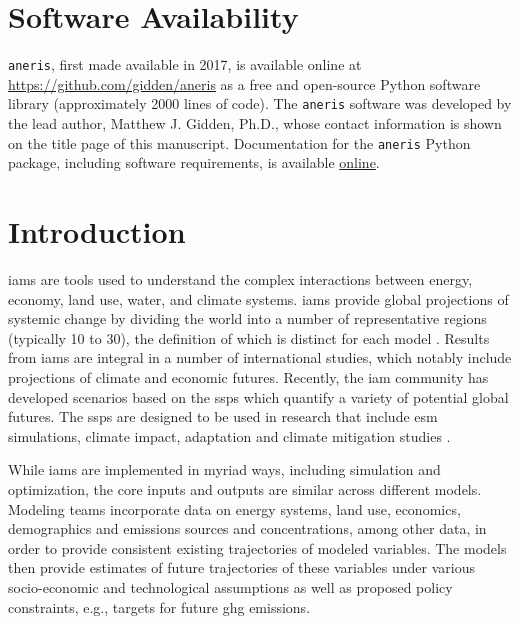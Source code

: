 \documentclass[review]{elsarticle}
\begin{document}
\linenumbers

\newpage
\section*{Software Availability}

\texttt{aneris}, first made available in 2017, is available online at
\url{https://github.com/gidden/aneris} as a free and open-source Python software
library (approximately 2000 lines of code). The \texttt{aneris} software was
developed by the lead author, Matthew J. Gidden, Ph.D., whose contact
information is shown on the title page of this manuscript. Documentation for the
\texttt{aneris} Python package, including software requirements, is available
\href{http://mattgidden.com/aneris/}{online}.

\newpage

\section{Introduction}

\glspl{iam} are tools used to understand the complex interactions between
energy, economy, land use, water, and climate systems. \glspl{iam} provide
global projections of systemic change by dividing the world into a number of
representative regions (typically 10 to 30), the definition of which is distinct
for each model \cite{krey_global_2014}. Results from \glspl{iam} are integral in
a number of international studies, which notably include projections of climate
and economic futures. Recently, the \gls{iam} community has developed scenarios
based on the \glspl{ssp} \cite{van_vuuren_energy_2017, fricko_marker_2017,
  fujimori_ssp3:_2017, calvin_ssp4:_2017, kriegler_fossil-fueled_2017} which
quantify a variety of potential global futures. The \glspl{ssp} are designed to
be used in research that include \gls{esm} simulations, climate impact,
adaptation and climate mitigation studies \cite{vuuren_new_2013}.

While \glspl{iam} are implemented in myriad ways, including simulation and
optimization, the core inputs and outputs are similar across different
models. Modeling teams incorporate data on energy systems, land use, economics,
demographics and emissions sources and concentrations, among other data, in
order to provide consistent existing trajectories of modeled variables. The
models then provide estimates of future trajectories of these variables under
various socio-economic and technological assumptions as well as proposed policy
constraints, e.g., targets for future \gls{ghg} emissions.
\end{document}
